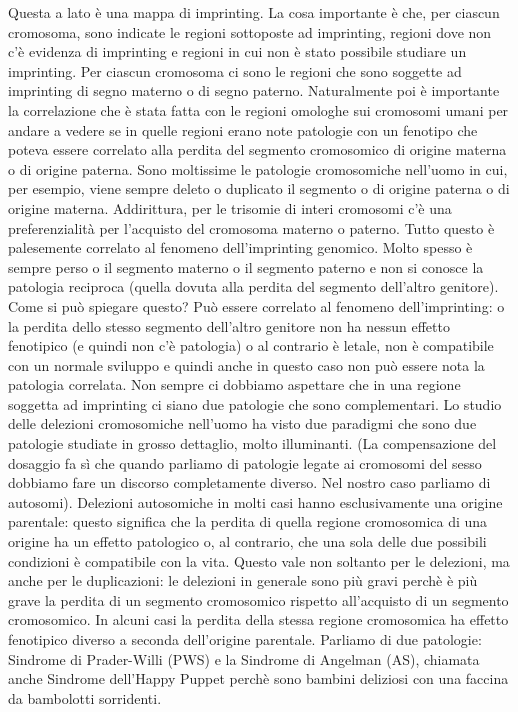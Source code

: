 \documentclass[11pt]{book}
\begin{document}
Questa a lato è una mappa di imprinting. La cosa importante è che, per ciascun cromosoma, sono indicate le regioni sottoposte ad imprinting, regioni dove non c’è evidenza di imprinting e regioni in cui non è stato possibile studiare un imprinting. 
Per ciascun cromosoma ci sono le regioni che sono soggette ad imprinting di segno materno o di segno paterno.
Naturalmente poi è importante la correlazione che è stata fatta con le regioni omologhe sui cromosomi umani per andare a vedere se in quelle regioni erano note patologie con un fenotipo che poteva essere correlato alla perdita del segmento cromosomico di origine materna o di origine paterna.
Sono moltissime le patologie cromosomiche nell’uomo in cui, per esempio, viene sempre deleto o duplicato il segmento o di origine paterna o di origine materna. Addirittura, per le trisomie di interi cromosomi c’è una preferenzialità per l’acquisto del cromosoma materno o paterno. Tutto questo è palesemente correlato al fenomeno dell’imprinting genomico.
Molto spesso è sempre perso o il segmento materno o il segmento paterno e non si conosce la patologia reciproca (quella dovuta alla perdita del segmento dell’altro genitore). Come si può spiegare questo? Può essere correlato al fenomeno dell’imprinting: o la perdita dello stesso segmento dell’altro genitore non ha nessun effetto fenotipico (e quindi non c’è patologia) o al contrario è letale, non è compatibile con un normale sviluppo e quindi anche in questo caso non può essere nota la patologia correlata. 
Non sempre ci dobbiamo aspettare che in una regione soggetta ad imprinting ci siano due patologie che sono complementari. 
Lo studio delle delezioni cromosomiche nell’uomo ha visto due paradigmi che sono due patologie studiate in grosso dettaglio, molto illuminanti.
(La compensazione del dosaggio fa sì che quando parliamo di patologie legate ai cromosomi del sesso dobbiamo fare un discorso completamente diverso. Nel nostro caso parliamo di autosomi).
Delezioni autosomiche in molti casi hanno esclusivamente una origine parentale: questo significa che la perdita di quella regione cromosomica di una origine ha un effetto patologico o, al contrario, che una sola delle due possibili condizioni è compatibile con la vita. Questo vale non soltanto per le delezioni, ma anche per le duplicazioni: le delezioni in generale sono più gravi perchè è più grave la perdita di un segmento cromosomico rispetto all’acquisto di un segmento cromosomico.
In alcuni casi la perdita della stessa regione cromosomica ha effetto fenotipico diverso a seconda dell’origine parentale.
Parliamo di due patologie: Sindrome di Prader-Willi (PWS) e la Sindrome di Angelman (AS), chiamata anche Sindrome dell’Happy Puppet perchè sono bambini deliziosi con una faccina da bambolotti sorridenti.
\end{document}
